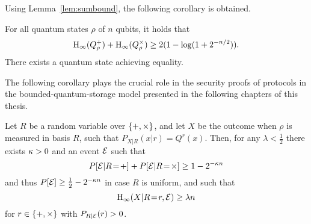 Using Lemma~\ref{lem:sumbound}, the following corollary is obtained.
\begin{corollary}\label{cor:pmax2} For all quantum states $\rho$ of
  $n$ qubits, it holds that
\[\H_\infty(Q_\rho^+) + \H_\infty(Q_\rho^\times) \geq 2 (1-\log(1+2^{-n/2})).
\]
There exists a quantum state achieving equality.
\end{corollary}

The following corollary plays the crucial role in the security proofs of
protocols in the 
bounded-quantum-storage model presented in the
following chapters of this thesis.
\begin{corollary} \label{cor:hadamard}
  Let $R$ be a random variable over $\set{+,\times}$, and let $X$ be
  the outcome when $\rho$ is measured in basis $R$, such that
  $P_{X| R}(x|r) = Q^r(x)$. Then, for any $\lambda < \frac12$ there
  exists $\sp>0$ and an event $\ev$ such that
$$
\P[\ev | R\!=\!+] + \P[\ev | R\!=\!\times] \geq 1 - 2^{-\sp n}
$$
and thus $\P[\ev] \geq \frac12 - 2^{-\sp n}$ in case $R$ is uniform, and such that 
$$
\H_{\infty}(X | R\!=\!r,\ev) \geq \lambda n 
$$
for $r \in \set{+,\times}$ with $P_{R| \ev}(r) > 0$. 
\end{corollary}


